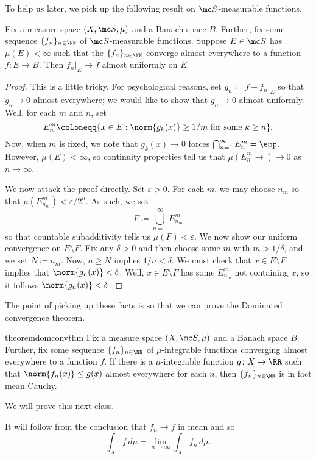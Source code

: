 \documentclass[../notes.tex]{subfiles}
\begin{document}
To help us later, we pick up the following result on $\mc S$-measurable functions.
\begin{theorem}[Egorov's] \label{thm:ego}
	Fix a measure space $(X,\mc S,\mu)$ and a Banach space $B$. Further, fix some sequence $\{f_n\}_{n\in\NN}$ of $\mc S$-measurable functions. Suppose $E\in\mc S$ has $\mu(E)<\infty$ such that the $\{f_n\}_{n\in\NN}$ converge almost everywhere to a function $f\colon E\to B$. Then $f_n|_E\to f$ almost uniformly on $E$.
\end{theorem}
\begin{proof}
	This is a little tricky. For psychological reasons, set $g_n\coloneqq f-f_n|_E$ so that $g_n\to0$ almost everywhere; we would like to show that $g_n\to0$ almost uniformly. Well, for each $m$ and $n$, set
	\[E^m_n\coloneqq\{x\in E:\norm{g_k(x)}\ge1/m\text{ for some }k\ge n\}.\]
	Now, when $m$ is fixed, we note that $g_k(x)\to0$ forces $\bigcap_{n=1}^\infty E^m_n=\emp$. However, $\mu(E)<\infty$, so continuity properties tell us that $\mu\left(E^m_n\to\right)\to0$ as $n\to\infty$. 

	We now attack the proof directly. Set $\varepsilon>0$. For each $m$, we may choose $n_m$ so that $\mu\left(E^m_{n_m}\right)<\varepsilon/2^n$. As such, we set
	\[F\coloneqq\bigcup_{n=1}^\infty E^m_{n_m}\]
	so that countable subadditivity tells us $\mu(F)<\varepsilon$. We now show our uniform convergence on $E\setminus F$. Fix any $\delta>0$ and then choose some $m$ with $m>1/\delta$, and we set $N\coloneqq n_m$. Now, $n\ge N$ implies $1/n<\delta$. We must check that $x\in E\setminus F$ implies that $\norm{g_n(x)}<\delta$. Well, $x\in E\setminus F$ has some $E^{m}_{n_m}$ not containing $x$, so it follows $\norm{g_n(x)}<\delta$.
\end{proof}
The point of picking up these facts is so that we can prove the Dominated convergence theorem.
\begin{restatable}{theorem}{domconvthm} \label{thm:dom-conv}
	Fix a measure space $(X,\mc S,\mu)$ and a Banach space $B$. Further, fix some sequence $\{f_n\}_{n\in\NN}$ of $\mu$-integrable functions converging almost everywhere to a function $f$. If there is a $\mu$-integrable function $g\colon X\to\RR$ such that $\norm{f_n(x)}\le g(x)$ almost everywhere for each $n$, then $\{f_n\}_{n\in\NN}$ is in fact mean Cauchy.
\end{restatable}
\noindent We will prove this next class.
\begin{remark}
	It will follow from the conclusion that $f_n\to f$ in mean and so
	\[\int_Xf\,d\mu=\lim_{n\to\infty}\int_Xf_n\,d\mu.\]
\end{remark}
\end{document}
